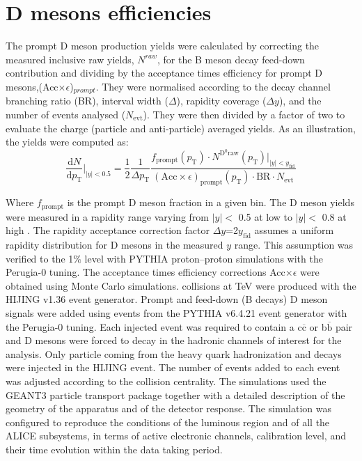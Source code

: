 \section{D mesons efficiencies}
\label{sec:eff}
The prompt D meson production yields were calculated by correcting the measured inclusive raw yields, $N^{raw}$, for the B meson decay feed-down contribution and dividing by the acceptance times efficiency for prompt D mesons,(Acc$\times \epsilon$)$_{prompt}$.  They were normalised according to the decay channel branching ratio (BR), \pt interval width ($\Delta$\pt), rapidity coverage ($\Delta y$), and the number of events analysed ($N_{\mathrm{evt}}$). 
They were then divided by a factor of two to evaluate the charge (particle and anti-particle) averaged yields. As an illustration, the \Dzero yields were computed as:
\begin{equation}
 \label{eq:effMethod}
 \frac{\mathrm{d}N}{\mathrm{d}p_{\mathrm{T}}}\bigg\rvert_{|y|<0.5} = \frac{1}{2}\frac{1}{\Delta p_{\mathrm{T}}} \frac{f_{\mathrm{prompt}}(p_{\mathrm{T}})\cdot N^{\mathrm{D^{0}raw}}(p_{\mathrm{T}})\bigg\rvert_{|y| < y_{\mathrm{fid}}}}{(\mathrm{Acc}\times\epsilon)_{\mathrm{prompt}}(p_{\mathrm{T}})\cdot \mathrm{BR} \cdot N_{\mathrm{evt}} }
\end{equation}

Where $f_{\mathrm{prompt}}$ is the prompt D meson fraction in a given \pt bin. The D meson yields were measured in a rapidity range varying from $|y|<$ 0.5 at low \pt to $|y|<$ 0.8 at high \pt. The rapidity acceptance correction factor $\Delta y$=2$y_{\mathrm{fid}}$ assumes a uniform rapidity distribution for D mesons in the measured $y$ range. This assumption was verified to the 1$\%$ level with PYTHIA \cite{Sjostrand:2006za} proton--proton simulations with the Perugia-0 \cite{Skands:2009zm} tuning.
The acceptance times efficiency corrections Acc$\times \epsilon$ were obtained using Monte Carlo simulations. \pbpb collisions at  TeV were produced with the HIJING v1.36 \cite{Wang:1991hta} event generator. Prompt and feed-down (B decays) D meson signals were added using \pp events from the PYTHIA v6.4.21 event generator with the Perugia-0 tuning.  Each injected \pp event was required to contain a c$\overline{\mathrm{c}}$ or b$\overline{\mathrm{b}}$ pair and D mesons were forced to decay in the hadronic channels of interest for the analysis.  Only particle coming from the heavy quark hadronization and decays were injected in the HIJING event.  The number of \pp events added to each \pbpb event was adjusted according to the \pbpb collision centrality. 
The simulations used the GEANT3 particle transport package together with a detailed description of the geometry of the apparatus and of the detector response. The simulation was configured to reproduce the conditions of the luminous region and of all the ALICE subsystems, in terms of active electronic channels, calibration level, and their time evolution within the \pbpb data taking period.

